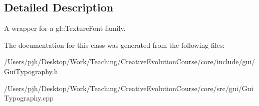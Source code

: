 \subsection{Detailed Description}
A wrapper for a gl\-::\-Texture\-Font family. 

The documentation for this class was generated from the following files\-:\begin{DoxyCompactItemize}
\item 
/\-Users/pjh/\-Desktop/\-Work/\-Teaching/\-Creative\-Evolution\-Course/core/include/gui/Gui\-Typography.\-h\item 
/\-Users/pjh/\-Desktop/\-Work/\-Teaching/\-Creative\-Evolution\-Course/core/src/gui/Gui\-Typography.\-cpp\end{DoxyCompactItemize}
